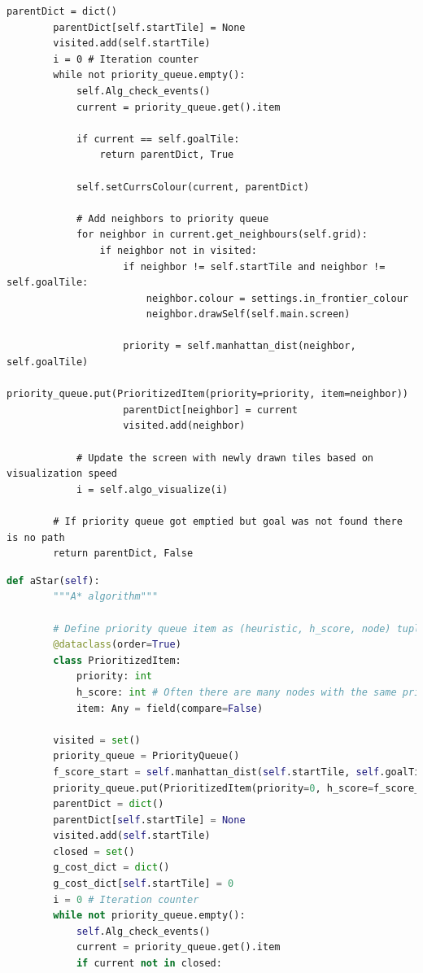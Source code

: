 \documentclass[12pt]{report}			%
\begin{document}
\begin{appendices}
\begin{lstlisting}[caption={Algoritmus greedy best-first search},captionpos=b]
        parentDict = dict()
        parentDict[self.startTile] = None
        visited.add(self.startTile)
        i = 0 # Iteration counter
        while not priority_queue.empty():
            self.Alg_check_events()
            current = priority_queue.get().item

            if current == self.goalTile:
                return parentDict, True

            self.setCurrsColour(current, parentDict)

            # Add neighbors to priority queue
            for neighbor in current.get_neighbours(self.grid):
                if neighbor not in visited:
                    if neighbor != self.startTile and neighbor != self.goalTile:
                        neighbor.colour = settings.in_frontier_colour
                        neighbor.drawSelf(self.main.screen)

                    priority = self.manhattan_dist(neighbor, self.goalTile)
                    priority_queue.put(PrioritizedItem(priority=priority, item=neighbor))
                    parentDict[neighbor] = current
                    visited.add(neighbor)

            # Update the screen with newly drawn tiles based on visualization speed
            i = self.algo_visualize(i)

        # If priority queue got emptied but goal was not found there is no path
        return parentDict, False
		\end{lstlisting}
		\newpage
		\begin{lstlisting}[language = Python, caption={Algoritmus A*},captionpos=b]
		def aStar(self):
        """A* algorithm"""

        # Define priority queue item as (heuristic, h_score, node) tuple
        @dataclass(order=True)
        class PrioritizedItem:
            priority: int
            h_score: int # Often there are many nodes with the same priority in Priority Q.;breaking ties on lower h results in A* expanding to get closer to the goal ASAP while maintaining optimality  
            item: Any = field(compare=False)

        visited = set()
        priority_queue = PriorityQueue()
        f_score_start = self.manhattan_dist(self.startTile, self.goalTile)
        priority_queue.put(PrioritizedItem(priority=0, h_score=f_score_start, item=self.startTile))
        parentDict = dict()
        parentDict[self.startTile] = None
        visited.add(self.startTile)
        closed = set()
        g_cost_dict = dict()
        g_cost_dict[self.startTile] = 0
        i = 0 # Iteration counter
        while not priority_queue.empty():
            self.Alg_check_events()
            current = priority_queue.get().item
            if current not in closed: 


\end{lstlisting}
\end{appendices}
\end{document}
